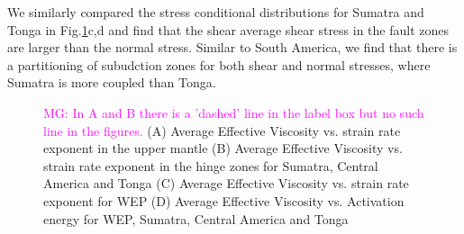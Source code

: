 \documentclass[12pt]{article}
\newcommand{\mgnote}[1]{\textcolor{magenta}{MG: #1}}
\begin{document}
We similarly compared the stress conditional distributions for Sumatra and Tonga in Fig.\ref{fig:shear_smaller}c,d and find that the shear average shear stress in the fault zones are larger than the normal stress. Similar to South America, we find that there is a partitioning of subudction zones for both shear and normal stresses, where Sumatra is more coupled than Tonga.


\begin{figure}[H]
\centering
\hspace{-0.2cm}
\hspace{-0.2cm}
\hspace{-0.2cm}
\hspace{-0.2cm}
\caption{
\mgnote{In A and B there is a 'dashed' line in the label box but no such line in the figures.}
(A) Average Effective Viscosity vs. strain rate exponent in the upper mantle  
(B)  Average Effective Viscosity vs. strain rate exponent in the hinge zones  for Sumatra, Central America and Tonga
(C) Average Effective Viscosity vs. strain rate exponent for WEP (D) Average Effective Viscosity vs. Activation energy for WEP, Sumatra, Central America and Tonga}
\label{fig:shear_smaller}
\end{figure}
\end{document}
